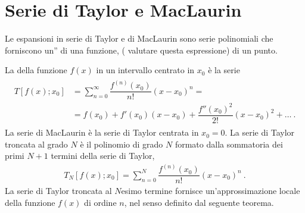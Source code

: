 \documentclass[letterpaper,10pt,italian]{jupyterBook}
\begin{document}
\section{Serie di Taylor e MacLaurin}
\label{\detokenize{ch/infinitesimal_calculus/derivatives:serie-di-taylor-e-maclaurin}}\label{\detokenize{ch/infinitesimal_calculus/derivatives:infinitesimal-calculus-derivatives-taylor}}
\sphinxAtStartPar
Le espansioni in serie di Taylor e di MacLaurin sono serie polinomiali che forniscono un” di una funzione,  ( valutare questa espressione) di un punto.

\sphinxAtStartPar
La  della funzione \(f(x)\) in un intervallo centrato in \(x_0\) è la serie
\begin{equation*}
\begin{split}\begin{aligned}
  T[f(x); x_0] & = \sum_{n=0}^{\infty} \dfrac{f^{(n)}(x_0)}{n!} (x-x_0)^n = \\
       & = f(x_0) + f'(x_0) (x-x_0) + \dfrac{f''(x_0)^2}{2!} (x-x_0)^2 + \dots \ .
\end{aligned}\end{split}
\end{equation*}
\sphinxAtStartPar
La serie di MacLaurin è la serie di Taylor centrata in \(x_0 = 0\). La serie di Taylor troncata al grado \(N\) è il polinomio di grado \(N\) formato dalla sommatoria dei primi \(N+1\) termini della serie di Taylor,
\begin{equation*}
\begin{split}T_N[f(x); x_0] = \sum_{n=0}^{N} \dfrac{f^{(n)}(x_0)}{n!} (x-x_0)^n \ .\end{split}
\end{equation*}
\sphinxAtStartPar
La serie di Taylor troncata al \(N\)\sphinxhyphen{}esimo termine fornisce un’approssimazione locale della funzione \(f(x)\) di ordine \(n\), nel senso definito dal seguente teorema.
\label{ch/infinitesimal_calculus/derivatives:thm:infinitesimal-calculus:derivatives:taylor}
\end{document}
